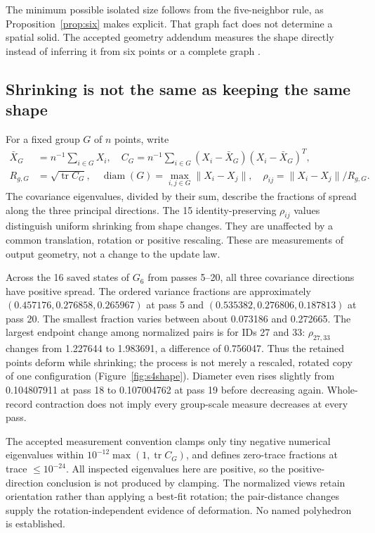 \documentclass[11pt,a4paper]{article}
\begin{document}
The minimum possible isolated size follows from the five-neighbor rule, as Proposition~\ref{prop:six} makes explicit. That graph fact does not determine a spatial solid. The accepted geometry addendum measures the shape directly instead of inferring it from six points or a complete graph \cite{addendum}.

\subsection{Shrinking is not the same as keeping the same shape}
For a fixed group $G$ of $n$ points, write
\begin{align}
\bar X_G&=n^{-1}\sum_{i\in G}X_i,\quad
C_G=n^{-1}\sum_{i\in G}(X_i-\bar X_G)(X_i-\bar X_G)^T,\label{eq:cov}\\
R_{g,G}&=\sqrt{\operatorname{tr}C_G},\quad
\operatorname{diam}(G)=\max_{i,j\in G}\|X_i-X_j\|,\quad
\rho_{ij}=\|X_i-X_j\|/R_{g,G}.\label{eq:geometry}
\end{align}
The covariance eigenvalues, divided by their sum, describe the fractions of spread along the three principal directions. The 15 identity-preserving $\rho_{ij}$ values distinguish uniform shrinking from shape changes. They are unaffected by a common translation, rotation or positive rescaling. These are measurements of output geometry, not a change to the update law.

Across the 16 saved states of $G_6$ from passes 5--20, all three covariance directions have positive spread. The ordered variance fractions are approximately $(0.457176,0.276858,0.265967)$ at pass 5 and $(0.535382,0.276806,0.187813)$ at pass 20. The smallest fraction varies between about 0.073186 and 0.272665. The largest endpoint change among normalized pairs is for IDs 27 and 33: $\rho_{27,33}$ changes from 1.227644 to 1.983691, a difference of 0.756047. Thus the retained points deform while shrinking; the process is not merely a rescaled, rotated copy of one configuration (Figure~\ref{fig:s4shape}). Diameter even rises slightly from 0.104807911 at pass 18 to 0.107004762 at pass 19 before decreasing again. Whole-record contraction does not imply every group-scale measure decreases at every pass.

The accepted measurement convention clamps only tiny negative numerical eigenvalues within $10^{-12}\max(1,\operatorname{tr}C_G)$, and defines zero-trace fractions at trace $\leq10^{-24}$. All inspected eigenvalues here are positive, so the positive-direction conclusion is not produced by clamping. The normalized views retain orientation rather than applying a best-fit rotation; the pair-distance changes supply the rotation-independent evidence of deformation. No named polyhedron is established.
\end{document}
